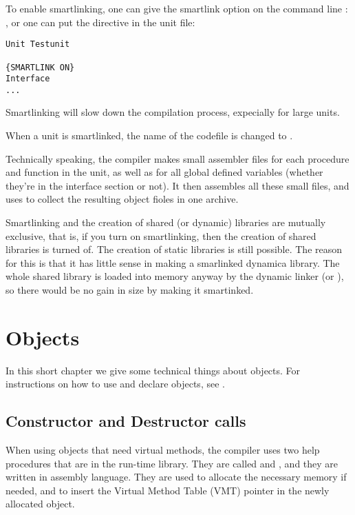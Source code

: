 \documentclass{report}
\begin{document}
To enable smartlinking, one can give the smartlink option on the command
line : , or one can put the  directive in
the unit file:
\begin{verbatim}
Unit Testunit

{SMARTLINK ON}
Interface
...
\end{verbatim}
Smartlinking will slow down the compilation process, expecially for large
units.

When a unit  is smartlinked, the name of the codefile is
changed to .

Technically speaking, the compiler makes small assembler files for each
procedure and function in the unit, as well as for all global defined
variables (whether they're in the interface section or not). It then
assembles all these small files, and uses  to collect the resulting
object fioles in one archive.

Smartlinking and the creation of shared (or dynamic) libraries are mutually
exclusive, that is, if you turn on smartlinking, then the creation of shared
libraries is turned of. The creation of static libraries is still possible.
The reason for this is that it has little sense in making a smarlinked
dynamica library. The whole shared library is loaded into memory anyway by
the dynamic linker (or \windowsnt), so there would be no gain in size by
making it smartinked.

\chapter{Objects}
\label{ch:Objects}
In this short chapter we give some technical things about objects. For
instructions on how to use and declare objects, see .

\section{Constructor and Destructor calls}
\label{se:ConsDest}
When using objects that need virtual methods, the compiler uses two help
procedures that are in the run-time library. They are called
 and , and they are written in
assembly language. They are used to allocate the necessary memory if needed,
and to insert the Virtual Method Table (VMT) pointer in the newly allocated
object.
\end{document}

